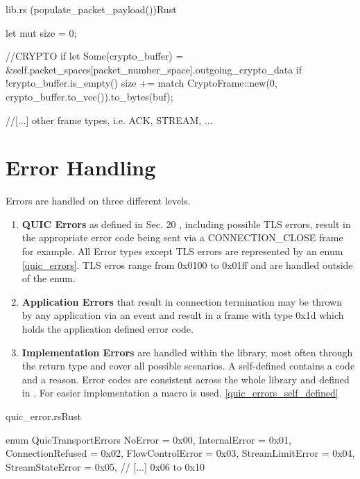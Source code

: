 \begin{codeblock}{lib.rs (populate\_packet\_payload())}{Rust}
    \begin{rustcode}
        let mut size = 0;

        //CRYPTO
        if let Some(crypto_buffer) = &self.packet_spaces[packet_number_space].outgoing_crypto_data {
            if !crypto_buffer.is_empty() {
                size += match CryptoFrame::new(0, crypto_buffer.to_vec()).to_bytes(buf);
            }
        }

        //[...] other frame types, i.e. ACK, STREAM, ...
    \end{rustcode}
    \label{populate_packet_payload}
\end{codeblock}

\section{Error Handling}

Errors are handled on three different levels.
\begingroup
\renewcommand\labelenumi{(\theenumi)}
\begin{enumerate}
\item \textbf{QUIC Errors} as defined in Sec. 20 \cite{rfc9000}, including possible TLS errors, result in the appropriate
error code being sent via a CONNECTION\_CLOSE frame for example. All Error types except TLS errors are represented by an enum 
\ref{quic_errors}. TLS erros range from 0x0100 to 0x01ff and are handled outside of the enum.
\item \textbf{Application Errors} that result in connection termination may be thrown by any application via an event and
result in a  frame with type 0x1d which holds the application defined error code.
\item \textbf{Implementation Errors} are handled within the library, most often through the  return
type and cover all possible scenarios. A self-defined  contains a code and a reason. Error codes are consistent across
the whole library and defined in . For easier implementation a macro is used. \ref{quic_errors_self_defined}
\end{enumerate}
\endgroup

\begin{codeblock}{quic\_error.rs}{Rust}
    \begin{rustcode}
        enum QuicTransportErrors {
            NoError = 0x00,
            InternalError = 0x01,
            ConnectionRefused = 0x02,
            FlowControlError = 0x03,
            StreamLimitError = 0x04,
            StreamStateError = 0x05,
            // [...] 0x06 to 0x10
        }
    \end{rustcode}
    \label{quic_errors}
\end{codeblock}

